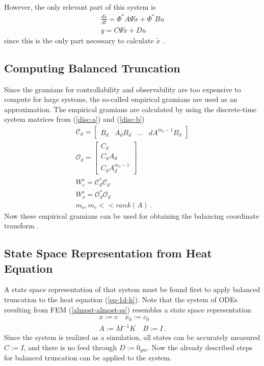 However, the only relevant part of this system is
\begin{gather}
\frac{d\tilde{x}}{dt} = \Phi^{*}A\Psi\tilde{x} + \Phi^{*}Bu \\
y = C\Psi\tilde{x} + Du  
\end{gather}
since this is the only part necessary to calculate \(\tilde{x}\)
\cite{brunton_kutz_2019e}.

\subsection{Computing Balanced Truncation}
Since the gramians for controllability and observability are too expensive to compute for large systems, the so-called empirical gramians are used as an approximation.
The empirical gramians are calculated by using the discrete-time system matrices from (\ref{disc-a}) and (\ref{disc-b})
\begin{gather}
\mathscr{C}_d = \begin{bmatrix}B_d & A_dB_d & \hdots & dA^{m_o -1}B_d\end{bmatrix} \\
\mathscr{O}_d = \begin{bmatrix}
C_d \\
C_dA_d \\
C_dA_d^{m_o - 1}
\end{bmatrix} \\
W_c^e = \mathscr{C}_d^{*}\mathscr{C}_d \\
W_o^e = \mathscr{O}_d^{*}\mathscr{O}_d \\
m_o, m_c << rank(A)  \,.
\end{gather}
Now these empirical gramians can be used for obtaining the balancing coordinate transform \cite{brunton_kutz_2019e}.

\subsection{State Space Representation from Heat Equation} \label{heat-ss}
A state space representation of that system must be found first to apply balanced truncation to the heat equation (\ref{eq-1d-h}).
Note that the system of ODEs resulting from FEM (\ref{almost-almost-ss}) resembles a state space representation
\begin{gather}
x := c \quad x_0 := c_0 \\
A := M^{-1}K \quad B:= I  \,.
\end{gather}
Since the system is realized as a simulation, all states can be accurately measured \(C := I\), and there is no feed through \(D := 0_{qm}\).
Now the already described steps for balanced truncation can be applied to the system.

